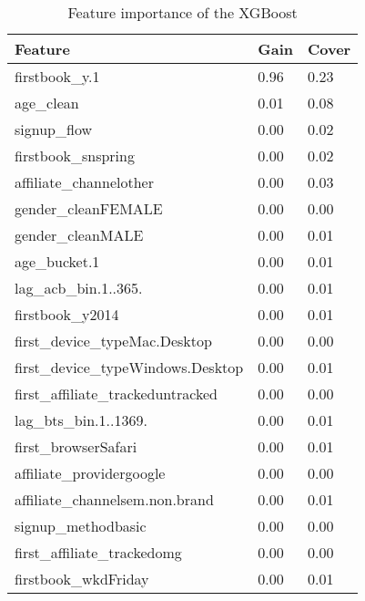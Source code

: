 \documentclass{article}
\begin{document}
\begin{table}[ht]
\centering
\begin{tabular}{| l | l | l |}
  \hline
  \textbf{Feature} & \textbf{Gain} & \textbf{Cover} \\ 
  \hline
  firstbook\_y.1 & 0.96 & 0.23 \\ 
  age\_clean & 0.01 & 0.08  \\ 
  signup\_flow & 0.00 & 0.02 \\ 
  firstbook\_snspring & 0.00 & 0.02 \\ 
  affiliate\_channelother & 0.00 & 0.03 \\ 
  gender\_cleanFEMALE & 0.00 & 0.00 \\ 
  gender\_cleanMALE & 0.00 & 0.01 \\ 
  age\_bucket.1 & 0.00 & 0.01 \\ 
  lag\_acb\_bin.1..365. & 0.00 & 0.01 \\ 
  firstbook\_y2014 & 0.00 & 0.01 \\ 
  first\_device\_typeMac.Desktop & 0.00 & 0.00 \\ 
  first\_device\_typeWindows.Desktop & 0.00 & 0.01 \\ 
  first\_affiliate\_trackeduntracked & 0.00 & 0.00 \\ 
  lag\_bts\_bin.1..1369. & 0.00 & 0.01 \\ 
  first\_browserSafari & 0.00 & 0.01 \\ 
  affiliate\_providergoogle & 0.00 & 0.00 \\ 
  affiliate\_channelsem.non.brand & 0.00 & 0.01 \\ 
  signup\_methodbasic & 0.00 & 0.00\\ 
  first\_affiliate\_trackedomg & 0.00 & 0.00\\ 
  firstbook\_wkdFriday & 0.00 & 0.01\\ 
   \hline
\end{tabular}
\caption{Feature importance of the XGBoost}
\label{table:feature_imp_xgb}
\end{table}
\end{document}

